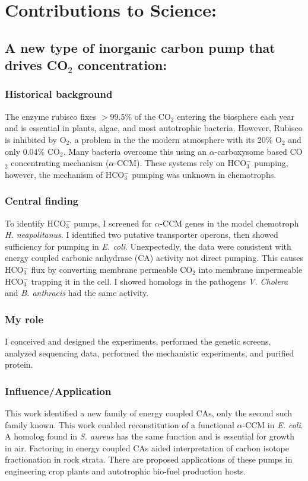 \documentclass{article}
\begin{document}
\section*{Contributions to Science:}
\newrefsection
\subsection{A new type of inorganic carbon pump that drives CO$_2$ concentration:}
\subsubsection{Historical background}
The enzyme rubisco fixes $>$99.5\% of the CO$_2$ entering the biosphere each year and is essential in plants, algae, and most autotrophic bacteria. 
However, Rubisco is inhibited by O$_2$, a problem in the the modern atmosphere with its 20\% O$_2$ and only 0.04\% CO$_2$.
Many bacteria overcome this using an $\alpha$-carboxysome based CO$_2$ concentrating mechanism ($\alpha$-CCM).
These systems rely on HCO$_{3}^{-}$ pumping, however, the mechanism of HCO$_{3}^{-}$ pumping was unknown in chemotrophs.
%
\subsubsection{Central finding}
To identify HCO$_{3}^{-}$ pumps, I screened for $\alpha$-CCM genes in the model chemotroph \textit{H. neapolitanus}.
I identified two putative transporter operons, then showed sufficiency for pumping in \textit{E. coli}. 
Unexpectedly, the data were consistent with energy coupled carbonic anhydrase (CA) activity not direct pumping.
This causes HCO$_{3}^{-}$ flux by converting membrane permeable CO$_2$ into membrane impermeable HCO$_{3}^{-}$ trapping it in the cell.
I showed homologs in the pathogens \textit{V. Cholera} and \textit{B. anthracis} had the same activity.
%
\subsubsection{My role}
I conceived and designed the experiments, performed the genetic screens, analyzed sequencing data, performed the mechanistic experiments, and purified protein.
%
\subsubsection{Influence/Application}
This work identified a new family of energy coupled CAs, only the second such family known.
This work enabled reconstitution of a functional $\alpha$-CCM in \textit{E. coli}. 
A homolog found in \textit{S. aureus} has the same function and is essential for growth in air. 
Factoring in energy coupled CAs aided interpretation of carbon isotope fractionation in rock strata.
There are proposed applications of these pumps in engineering crop plants and autotrophic bio-fuel production hosts.
%
\nocite{Desmarais2019-yc,Desmarais2018-ac,Desmarais2019-dc}
\printbibliography[heading=none]
\end{document}

